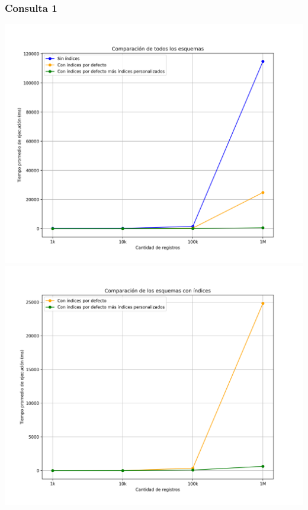 \subsubsection{Consulta 1}
\begin{center}
	\includegraphics[width=\linewidth, keepaspectratio]{figures/query_1_execution_times_1.png}
	\includegraphics[width=\linewidth, keepaspectratio]{figures/query_1_execution_times_2.png}
\end{center}
